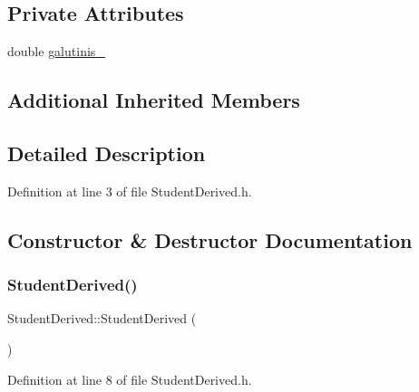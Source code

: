 \subsection*{Private Attributes}
\begin{DoxyCompactItemize}
\item 
double \mbox{\hyperlink{class_student_derived_aba98ad07d71e74bc0c0c8e5be5d2ff81}{galutinis\+\_\+}}
\end{DoxyCompactItemize}
\subsection*{Additional Inherited Members}


\subsection{Detailed Description}


Definition at line 3 of file Student\+Derived.\+h.



\subsection{Constructor \& Destructor Documentation}
\mbox{\label{class_student_derived_a4973839c7d096e6c35b9783e3fe6bf85}} 
\subsubsection{\texorpdfstring{StudentDerived()}{StudentDerived()}\hspace{0.1cm}{\footnotesize\ttfamily [1/3]}}
{\footnotesize\ttfamily Student\+Derived\+::\+Student\+Derived (\begin{DoxyParamCaption}{ }\end{DoxyParamCaption})\hspace{0.3cm}{\ttfamily [inline]}}



Definition at line 8 of file Student\+Derived.\+h.

\mbox{\label{class_student_derived_ae5a350a75a5555304df23a2d1c37b52c}} 
